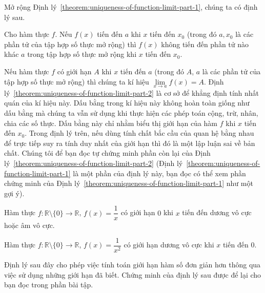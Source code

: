 Mở rộng Định lý~\ref{theorem:uniqueness-of-function-limit-part-1}, chúng ta có định lý sau.
\begin{theorem}\label{theorem:uniqueness-of-function-limit-part-2}
    Cho hàm thực $f$. Nếu $f(x)$ tiến đến $a$ khi $x$ tiến đến $x_{0}$ (trong đó $a, x_{0}$ là các phần tử của tập hợp số thực mở rộng) thì $f(x)$ không tiến đến phần tử nào khác $a$ trong tập hợp số thực mở rộng khi $x$ tiến đến $x_{0}$.
\end{theorem}

Nếu hàm thực $f$ có giới hạn $A$ khi $x$ tiến đến $a$ (trong đó $A$, $a$ là các phần tử của tập hợp số thực mở rộng) thì chúng ta kí hiệu $\lim\limits_{x\to a} f(x) = A$. Định lý~\ref{theorem:uniqueness-of-function-limit-part-2} là cơ sở để khẳng định tính nhất quán của kí hiệu này. Dấu bằng trong kí hiệu này không hoàn toàn giống như dấu bằng mà chúng ta vẫn sử dụng khi thực hiện các phép toán cộng, trừ, nhân, chia các số thực. Dấu bằng này chỉ nhằm biểu thị giới hạn của hàm $f$ khi $x$ tiến đến $x_{0}$. Trong định lý trên, nếu dùng tính chất bắc cầu của quan hệ bằng nhau để trực tiếp suy ra tính duy nhất của giới hạn thì đó là một lập luận sai về bản chất. Chúng tôi để bạn đọc tự chứng minh phần còn lại của Định lý~\ref{theorem:uniqueness-of-function-limit-part-2} (Định lý~\ref{theorem:uniqueness-of-function-limit-part-1} là một phần của định lý này, bạn đọc có thể xem phần chứng minh của Định lý~\ref{theorem:uniqueness-of-function-limit-part-1} như một gợi ý).

\begin{example}
    Hàm thực $f: \mathbb{R}\setminus\{0\}\to \mathbb{R}$, $f(x) = \dfrac{1}{x}$ có giới hạn $0$ khi $x$ tiến đến dương vô cực hoặc âm vô cực.
\end{example}

\begin{example}
    Hàm thực $f: \mathbb{R}\setminus\{0\}\to \mathbb{R}$, $f(x) = \dfrac{1}{x^{2}}$ có giới hạn dương vô cực khi $x$ tiến đến $0$.
\end{example}

Định lý sau đây cho phép việc tính toán giới hạn hàm số đơn giản hơn thông qua việc sử dụng những giới hạn đã biết. Chứng minh của định lý sau được để lại cho bạn đọc trong phần bài tập.



